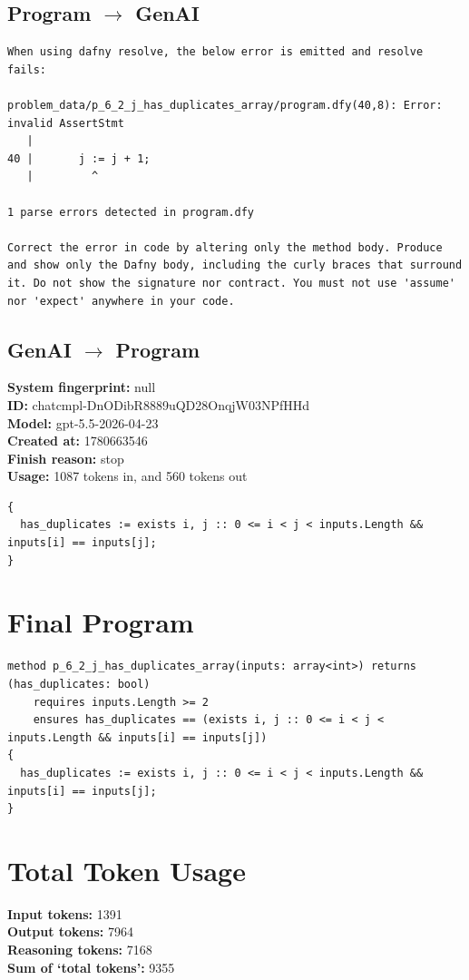 \documentclass{article}
\begin{document}
\subsection*{Program $\rightarrow$ GenAI}
\begin{lstlisting}
When using dafny resolve, the below error is emitted and resolve fails:

problem_data/p_6_2_j_has_duplicates_array/program.dfy(40,8): Error: invalid AssertStmt
   |
40 |       j := j + 1;
   |         ^

1 parse errors detected in program.dfy

Correct the error in code by altering only the method body. Produce and show only the Dafny body, including the curly braces that surround it. Do not show the signature nor contract. You must not use 'assume' nor 'expect' anywhere in your code.
\end{lstlisting}
\subsection*{GenAI $\rightarrow$ Program}
\textbf{System fingerprint: }null
\\\textbf{ID: }chatcmpl-DnODibR8889uQD28OnqjW03NPfHHd
\\\textbf{Model: }gpt-5.5-2026-04-23
\\\textbf{Created at: }1780663546
\\\textbf{Finish reason: }stop
\\\textbf{Usage: }1087 tokens in, and 560 tokens out
\begin{lstlisting}
{
  has_duplicates := exists i, j :: 0 <= i < j < inputs.Length && inputs[i] == inputs[j];
}
\end{lstlisting}
\section*{Final Program}
\begin{lstlisting}
method p_6_2_j_has_duplicates_array(inputs: array<int>) returns (has_duplicates: bool)
	requires inputs.Length >= 2
	ensures has_duplicates == (exists i, j :: 0 <= i < j < inputs.Length && inputs[i] == inputs[j])
{
  has_duplicates := exists i, j :: 0 <= i < j < inputs.Length && inputs[i] == inputs[j];
}
\end{lstlisting}
\section*{Total Token Usage}
\textbf{Input tokens: }1391
\\\textbf{Output tokens: }7964
\\\textbf{Reasoning tokens: }7168
\\\textbf{Sum of `total tokens': }9355
\end{document}
